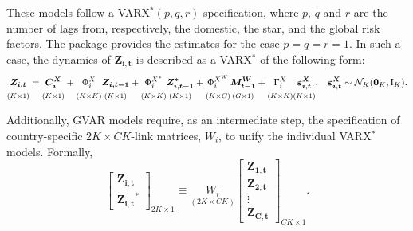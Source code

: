 These models follow a VARX\(^{*}(p,q,r)\) specification, where \(p\), \(q\) and \(r\) are the number of lags from, respectively, the domestic, the star, and the global risk factors. The  package provides the estimates for the case \(p=q=r=1\). In such a case, the dynamics of \(\boldsymbol{Z_{i,t}}\) is described as a VARX\(^{*}\) of the following form:
\begin{align}
& \underset{(K \times 1)}{\vphantom{\Big|}
\boldsymbol{Z_{i,t}}}  =
\underset{(K \times 1)}{\vphantom{\Big|}
\boldsymbol{C^X_{i}}} +
\underset{(K \times K)}{\vphantom{\Big|}
\Phi^X_{i}}
\underset{(K \times 1)}{\vphantom{\Big|}
\boldsymbol{Z_{i,t-1}}} +
\underset{(K \times K)}{\vphantom{\Big|}
\Phi^{X^\ast}_i}
\underset{(K \times 1)}{\vphantom{\Big|}
\boldsymbol{Z_{i,t-1}^{\ast}}} +
\underset{(K \times G)}{\vphantom{\Big|}
\Phi_{i}^{X^{W}}}
\underset{(G \times 1)}{\vphantom{\Big|}
\boldsymbol{M_{t-1}^{W}}} +
\underset{(K \times K)}{\vphantom{\Big|}
\Gamma_{i}^{X}}
\underset{(K \times 1)}{\vphantom{\Big|}
\boldsymbol{\varepsilon^X_{i,t}}}\text{,}    & \boldsymbol{\varepsilon^X_{i,t}} \sim {\mathcal{N}_K}(\boldsymbol{0}_K,\mathrm{I}_K).
\label{eq:VARXmodel}
\end{align}

Additionally, GVAR models require, as an intermediate step, the specification of country-specific \(2K \times CK\)-link matrices, \(W_i\), to unify the individual VARX\(^{*}\) models. Formally,
\begin{equation}
\begin{bmatrix} \boldsymbol{Z_{i,t}} \\ \boldsymbol{Z_{i,t}}^{*} \end{bmatrix}_{2K \times 1} \equiv \underset{(2K \times CK)}{W_i} \begin{bmatrix} \boldsymbol{Z_{1,t}} \\  \boldsymbol{Z_{2,t}} \\     \vdots  \\ \boldsymbol{Z_{C,t}}
\end{bmatrix}_{CK \times 1}.
\label{eq:LinkMatequation}
\end{equation}

